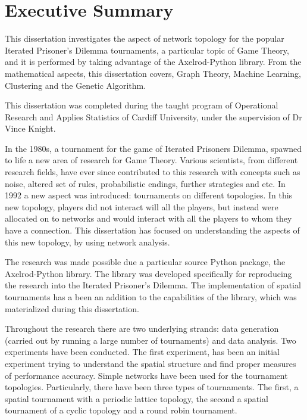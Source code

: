 \chapter{Executive Summary}
This dissertation investigates the aspect of network topology for the popular
Iterated Prisoner's Dilemma tournaments, a particular topic of  Game
Theory, and it is performed by taking advantage of the Axelrod-Python library.
From the mathematical aspects, this dissertation covers, Graph Theory,
Machine Learning, Clustering and the Genetic Algorithm.

This dissertation was completed during the taught program of Operational Research
and Applies Statistics of Cardiff University, under the supervision of Dr Vince
Knight.

In the 1980s, a tournament for the game of Iterated Prisoners Dilemma, spawned to
life a new area of research for Game Theory. Various scientists, from different
research fields, have ever since contributed to this research with concepts
such as noise, altered set of rules, probabilistic endings, further strategies and etc.
In 1992 a new aspect was introduced: tournaments on different topologies.
In this new topology, players did not interact will all the players, but instead
were allocated on to networks and would interact with all the players to whom they have a
connection. This dissertation has focused on understanding the aspects of
this new topology, by using network analysis.

The research was made possible due a particular source Python package, the
Axelrod-Python library. The library was developed specifically for
reproducing the research into the Iterated Prisoner's Dilemma. The implementation
of spatial tournaments has a been an addition to the capabilities of the library,
which was materialized during this dissertation. %

Throughout the research there are two underlying strands: data generation (carried
out by running a large number of tournaments) and data analysis.
Two experiments have been conducted. The first experiment, has been an initial
experiment trying to understand the spatial structure and find proper measures
of performance accuracy. Simple networks have been used for the tournament
topologies. Particularly, there have been three types of tournaments.
The first, a spatial tournament with a periodic lattice topology, the
second a spatial tournament of a cyclic topology and a round robin tournament.

